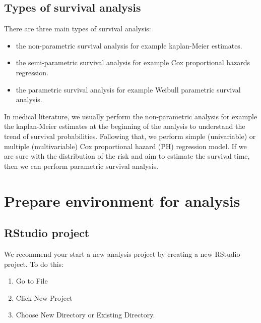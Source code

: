 \documentclass[
  10pt,
]{krantz}
\providecommand{\tightlist}{%
  \setlength{\itemsep}{0pt}\setlength{\parskip}{0pt}}
\begin{document}
\hypertarget{types-of-survival-analysis}{%
\subsection{Types of survival analysis}\label{types-of-survival-analysis}}

There are three main types of survival analysis:

\begin{itemize}
\tightlist
\item
  the non-parametric survival analysis for example kaplan-Meier estimates.
\item
  the semi-parametric survival analysis for example Cox proportional hazards regression.
\item
  the parametric survival analysis for example Weibull parametric survival analysis.
\end{itemize}

In medical literature, we usually perform the non-parametric analysis for example the kaplan-Meier estimates at the beginning of the analysis to understand the trend of survival probabilities. Following that, we perform simple (univariable) or multiple (multivariable) Cox proportional hazard (PH) regression model. If we are sure with the distribution of the risk and aim to estimate the survival time, then we can perform parametric survival analysis.

\hypertarget{prepare-environment-for-analysis-1}{%
\section{Prepare environment for analysis}\label{prepare-environment-for-analysis-1}}

\hypertarget{rstudio-project-1}{%
\subsection{RStudio project}\label{rstudio-project-1}}

We recommend your start a new analysis project by creating a new RStudio project. To do this:

\begin{enumerate}
\def\labelenumi{\arabic{enumi}.}
\tightlist
\item
  Go to File
\item
  Click New Project
\item
  Choose New Directory or Existing Directory.
\end{enumerate}
\end{document}

